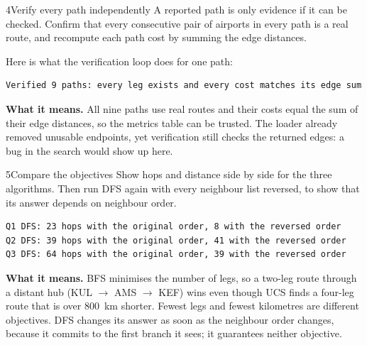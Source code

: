 \begin{labquestion}{4}{Verify every path independently}
A reported path is only evidence if it can be checked. Confirm that every consecutive pair of airports in every path is a real route, and recompute each path cost by summing the edge distances.
\end{labquestion}
\begin{labanswer}
Here is what the verification loop does for one path:



\begin{refoutput}
\begin{lstlisting}[style=utpterminal]
Verified 9 paths: every leg exists and every cost matches its edge sum
\end{lstlisting}
\end{refoutput}

\textbf{What it means.} All nine paths use real routes and their costs equal the sum of their edge distances, so the metrics table can be trusted. The loader already removed unusable endpoints, yet verification still checks the returned edges: a bug in the search would show up here.
\end{labanswer}

\begin{labquestion}{5}{Compare the objectives}
Show hops and distance side by side for the three algorithms. Then run DFS again with every neighbour list reversed, to show that its answer depends on neighbour order.
\end{labquestion}
\begin{labanswer}

\begin{refoutput}
\begin{lstlisting}[style=utpterminal]
Q1 DFS: 23 hops with the original order, 8 with the reversed order
Q2 DFS: 39 hops with the original order, 41 with the reversed order
Q3 DFS: 64 hops with the original order, 39 with the reversed order
\end{lstlisting}
\end{refoutput}

\textbf{What it means.} BFS minimises the number of legs, so a two-leg route through a distant hub (KUL $\rightarrow$ AMS $\rightarrow$ KEF) wins even though UCS finds a four-leg route that is over 800~km shorter. Fewest legs and fewest kilometres are different objectives. DFS changes its answer as soon as the neighbour order changes, because it commits to the first branch it sees; it guarantees neither objective.
\end{labanswer}

